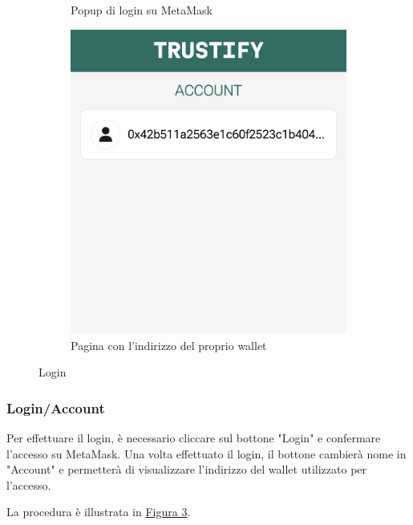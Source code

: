 \begin{figure}[H]
\begin{subfigure}[t]{0.32\textwidth}
    \caption{Popup di login su MetaMask}\label{fig:login_metamask}
    \end{subfigure}
    \centering
    \begin{subfigure}[t]{0.32\textwidth}
    \centering
    \includegraphics[width=0.9\linewidth]{src/img/account.png}
      \caption{Pagina con l'indirizzo del proprio wallet}\label{fig:account}
    \end{subfigure}

    \caption{Login}\label{fig:login}
\end{figure}
\subsubsection{Login/Account}
Per effettuare il login, è necessario cliccare sul bottone "Login" e confermare l'accesso su MetaMask. Una volta effettuato il login, il bottone cambierà nome in "Account" e permetterà di visualizzare l'indirizzo del wallet utilizzato per l'accesso.

La procedura è illustrata in \hyperref[fig:login]{Figura 3}.
